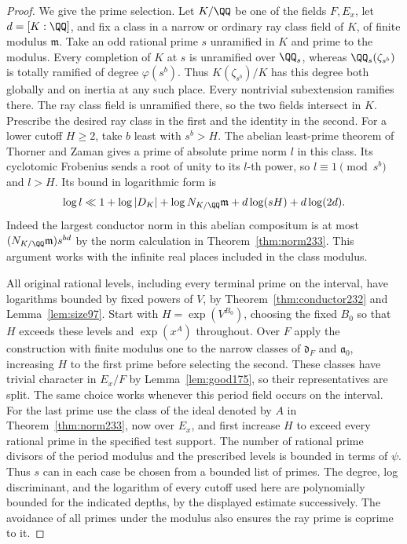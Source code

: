 \documentclass[a4paper,11pt]{article}
\theoremstyle{definition}
\theoremstyle{remark}
\numberwithin{equation}{section}
\begin{document}
\begin{proof}
We give the prime selection. Let \(K/\QQ\) be one of the fields
\(F,E_x\), let \(d=[K:\QQ]\), and fix a class in a narrow or
ordinary ray class field of \(K\), of finite modulus \(\mathfrak m\).
Take an odd rational prime \(s\) unramified in \(K\) and prime to
the modulus. Every completion of \(K\) at \(s\) is unramified over
\(\QQ_s\), whereas \(\QQ_s(\zeta_{s^b})\) is totally ramified of
degree \(\varphi(s^b)\). Thus \(K(\zeta_{s^b})/K\) has this degree
both globally and on inertia at any such place. Every nontrivial
subextension ramifies there. The ray class field is unramified
there, so the two fields intersect in \(K\). Prescribe the desired
ray class in the first and the identity in the second. For a lower
cutoff \(H\ge2\), take \(b\) least with \(s^b>H\). The abelian
least-prime theorem of Thorner and Zaman gives a prime of absolute
prime norm \(l\) in this class. Its cyclotomic Frobenius sends a
root of unity to its \(l\)-th power, so \(l\equiv1\pmod{s^b}\)
and \(l>H\). Its bound in logarithmic form is
\[
   \log l\ll 1+\log |D_K|+\log N_{K/\QQ}\mathfrak m
                         +d\log(sH)+d\log(2d).
\]
Indeed the largest conductor norm in this abelian compositum is at
most \((N_{K/\QQ}\mathfrak m)s^{bd}\) by the norm calculation in
Theorem~\ref{thm:norm233}. This argument works with
the infinite real places included in the class modulus.

All original rational levels, including every terminal prime on
the interval, have logarithms bounded by fixed powers of \(V\),
by Theorem~\ref{thm:conductor232} and Lemma~\ref{lem:size97}. Start with \(H=\exp(V^{B_0})\), choosing
the fixed \(B_0\) so that \(H\) exceeds these levels and
\(\exp(x^A)\) throughout. Over \(F\) apply the construction with finite modulus
one to the narrow classes of \(\mathfrak d_F\) and \(\mathfrak a_0\),
increasing \(H\) to the first prime before selecting the second.
These classes have trivial character in \(E_x/F\) by Lemma~\ref{lem:good175}, so their representatives are split. The same
choice works whenever this period field occurs on the interval.
For the last prime use the class of the ideal denoted by \(A\) in
Theorem~\ref{thm:norm233}, now over \(E_x\), and first
increase \(H\) to exceed every rational prime in the specified test
support. The number of rational prime divisors of the period
modulus and the prescribed levels is bounded in terms of \(\psi\).
Thus \(s\) can in each case be chosen from a bounded list of primes.
The degree, log discriminant, and the logarithm of every cutoff
used here are polynomially bounded for the indicated depths, by
the displayed estimate successively. The avoidance of all primes
under the modulus also ensures the ray prime is coprime to it.


\end{proof}
\end{document}
